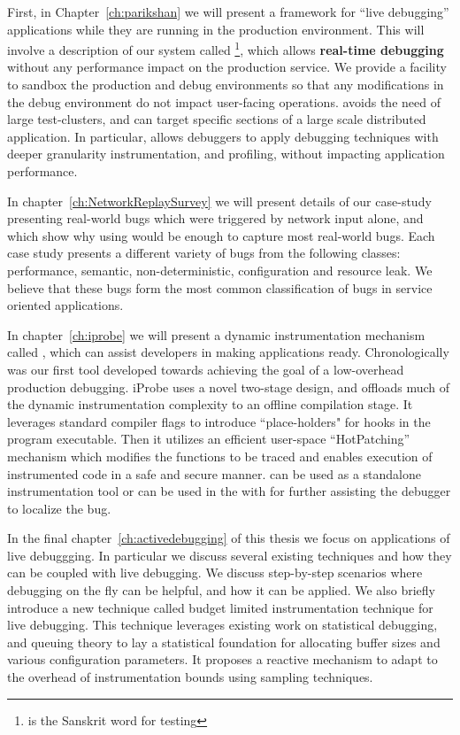First, in Chapter~\ref{ch:parikshan} we will present a framework for ``live debugging'' applications while they are running in the production environment.
This will involve a description of our system called \parikshan\footnote{\parikshan is the Sanskrit word for  testing}, which allows \textbf{real-time debugging} without any performance impact on the production service.
We provide a facility to sandbox the production and debug environments so that any modifications in the debug environment do not impact user-facing operations.
\parikshan avoids the need of large test-clusters, and can target specific sections of a large scale distributed application.
In particular, \parikshan allows debuggers to apply debugging techniques with deeper granularity instrumentation, and profiling, without impacting application performance.

In chapter~\ref{ch:NetworkReplaySurvey} we will present details of our case-study presenting real-world bugs which were triggered by network input alone, and which show why using \parikshan would be enough to capture most real-world bugs. 
Each case study presents a different variety of bugs from the following classes: performance, semantic, non-deterministic, configuration and resource leak. 
We believe that these bugs form the most common classification of bugs in service oriented applications.

In chapter~\ref{ch:iprobe} we will present a dynamic instrumentation mechanism called \iprobe, which can assist developers in making applications \parikshan ready.
Chronologically \iprobe was our first tool developed towards achieving the goal of a low-overhead production debugging.
iProbe uses a novel two-stage design, and offloads much of the dynamic instrumentation complexity to an offline compilation stage.
It leverages standard compiler flags to introduce ``place-holders" for hooks in the program executable.
Then it utilizes an efficient user-space ``HotPatching'' mechanism which modifies the functions to be traced and enables execution of instrumented code in a safe and secure manner.
\iprobe can be used as a standalone instrumentation tool or can be used in the \debugcontainer with \parikshan for further assisting the debugger to localize the bug.

In the final chapter~\ref{ch:activedebugging} of this thesis we focus on applications of live debuggging. 
In particular we discuss several existing techniques and how they can be coupled with live debugging. 
We discuss step-by-step scenarios where debugging on the fly can be helpful, and how it can be applied.
We also briefly introduce a new technique called budget limited instrumentation technique for live debugging.
This technique leverages existing work on statistical debugging, and queuing theory to lay a statistical foundation for allocating buffer sizes and various configuration parameters.
It proposes a reactive mechanism to adapt to the overhead of instrumentation bounds using sampling techniques.

